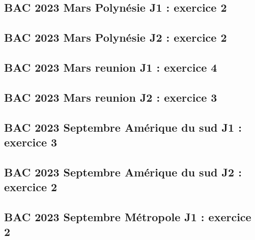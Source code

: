 \documentclass[lang=fr,edition=teacher,layout=sheet]{mxbook}
\begin{document}
\subsection*{BAC 2023 Mars Polynésie J1 : exercice 2}
\begingroup\endgroup
\par\bigskip
{}\subsection*{BAC 2023 Mars Polynésie J2 : exercice 2}
\begingroup\endgroup
\par\bigskip
{}\subsection*{BAC 2023 Mars reunion J1 : exercice 4}
\begingroup\endgroup
\par\bigskip
{}\subsection*{BAC 2023 Mars reunion J2 : exercice 3}
\begingroup\endgroup
\par\bigskip
{}\subsection*{BAC 2023 Septembre Amérique du sud J1 : exercice 3}
\begingroup\endgroup
\par\bigskip
{}\subsection*{BAC 2023 Septembre Amérique du sud J2 : exercice 2}
\begingroup\endgroup
\par\bigskip
{}\subsection*{BAC 2023 Septembre Métropole J1 : exercice 2}
\end{document}

